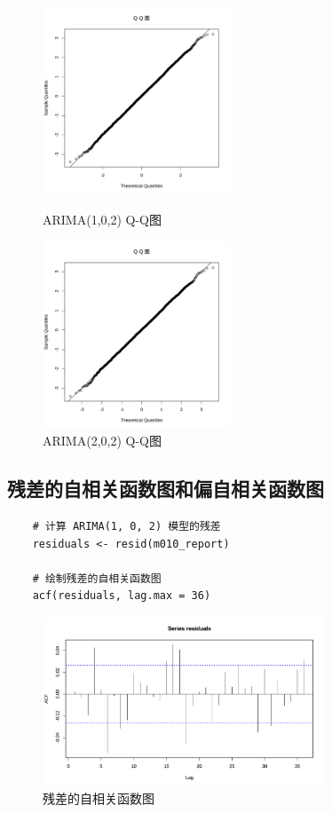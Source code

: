 \documentclass{article} %
\begin{document}
\begin{figure}[H]
    \begin{minipage}[t]{0.5\linewidth}
    \centering
    \includegraphics[width=2.2in]{pic/qq_fake.pdf}
    \caption{ARIMA(1,0,2) Q-Q图}
    \label{fig:side:a}
    \end{minipage}%
    \begin{minipage}[t]{0.5\linewidth}
    \centering
    \includegraphics[width=2.2in]{pic/qq_fake1.pdf}
    \caption{ARIMA(2,0,2) Q-Q图}
    \label{fig:side:b}
    \end{minipage}
\end{figure}

\subsection{残差的自相关函数图和偏自相关函数图}
\begin{lstlisting}
    # 计算 ARIMA(1, 0, 2) 模型的残差
    residuals <- resid(m010_report)
    
    # 绘制残差的自相关函数图
    acf(residuals, lag.max = 36)
\end{lstlisting}

\begin{figure}[H] %
	\centering %
	\includegraphics[width=0.75\textwidth]{pic/resacf.pdf} %
	\caption{残差的自相关函数图} %
\end{figure}
\end{document}
